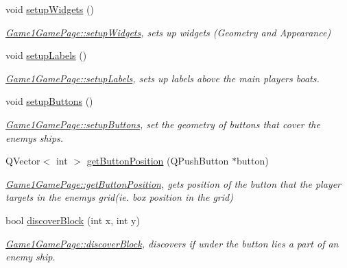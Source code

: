 \begin{DoxyCompactItemize}
\mbox{\label{classGame1GamePage_a23606106eb189fdbe197c77d717b845c}} 
void \hyperlink{classGame1GamePage_a23606106eb189fdbe197c77d717b845c}{setup\+Widgets} ()
\begin{DoxyCompactList}\small\item\em \hyperlink{classGame1GamePage_a23606106eb189fdbe197c77d717b845c}{Game1\+Game\+Page\+::setup\+Widgets}, sets up widgets (Geometry and Appearance) \end{DoxyCompactList}\item 
void \hyperlink{classGame1GamePage_a071eb05d04c53abb1f82fe66ad656040}{setup\+Labels} ()
\begin{DoxyCompactList}\small\item\em \hyperlink{classGame1GamePage_a071eb05d04c53abb1f82fe66ad656040}{Game1\+Game\+Page\+::setup\+Labels}, sets up labels above the main players boats. \end{DoxyCompactList}\item 
void \hyperlink{classGame1GamePage_a55c34bef7d0cb08a617aba01ad556c8c}{setup\+Buttons} ()
\begin{DoxyCompactList}\small\item\em \hyperlink{classGame1GamePage_a55c34bef7d0cb08a617aba01ad556c8c}{Game1\+Game\+Page\+::setup\+Buttons}, set the geometry of buttons that cover the enemy\textquotesingle{}s ships. \end{DoxyCompactList}\item 
Q\+Vector$<$ int $>$ \hyperlink{classGame1GamePage_a47232d81c8e7f96bbf70a16821f86157}{get\+Button\+Position} (Q\+Push\+Button $\ast$button)
\begin{DoxyCompactList}\small\item\em \hyperlink{classGame1GamePage_a47232d81c8e7f96bbf70a16821f86157}{Game1\+Game\+Page\+::get\+Button\+Position}, gets position of the button that the player targets in the enemy\textquotesingle{}s grid(ie. box position in the grid) \end{DoxyCompactList}\item 
bool \hyperlink{classGame1GamePage_aa70f99c3dafab2856e116f1c37efe4e8}{discover\+Block} (int x, int y)
\begin{DoxyCompactList}\small\item\em \hyperlink{classGame1GamePage_aa70f99c3dafab2856e116f1c37efe4e8}{Game1\+Game\+Page\+::discover\+Block}, discovers if under the button lies a part of an enemy ship. \end{DoxyCompactList}\end{DoxyCompactItemize}
